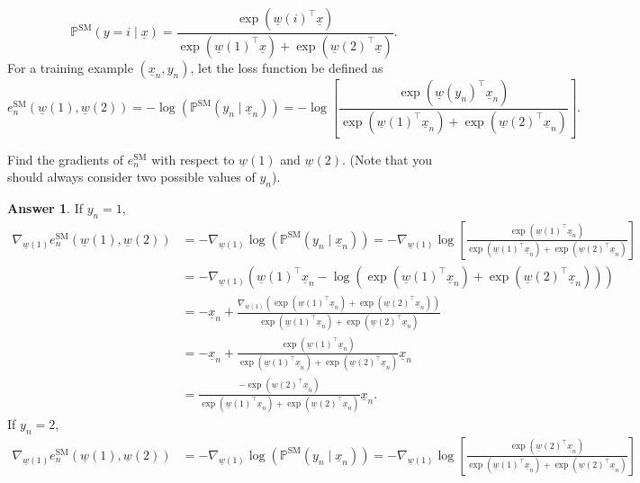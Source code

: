 \documentclass{article}
\newcommand{\probP}{\mathds{P}}
\theoremstyle{definition}
\newtheorem*{answer}{Answer}
\begin{document}
\begin{question}[start=0]
	\[
	\probP^{\text{SM}}(y = i\mid \underline{x}) = \frac{\exp(\underline{w}(i)^\top \underline{x})}{\exp(\underline{w}(1)^\top \underline{x}) + \exp(\underline{w}(2)^\top \underline{x})}.
	\]
	For a training example $(\underline{x}_n, y_n)$, let the loss function be defined as
	\[
	e^{\text{SM}}_{n}(\underline{w}(1), \underline{w}(2)) = -\log(\probP^{\text{SM}}(y_n\mid \underline{x}_n)) = -\log\left[\frac{\exp(\underline{w}(y_n)^\top \underline{x}_n)}{\exp(\underline{w}(1)^\top\underline{x}_n) + \exp(\underline{w}(2)^\top\underline{x}_n)}\right].
	\]
	\begin{question}
		\item Find the gradients of $e^{\text{SM}}_{n}$ with respect to $\underline{w}(1)$ and $\underline{w}(2)$. (Note that you should always consider two possible values of $y_n$).
		\begin{answer}
			If $y_n = 1$, 
			\begin{align*}
				\nabla_{\!\underline{w}(1)}e^{\text{SM}}_{n}(\underline{w}(1), \underline{w}(2)) &= - \nabla_{\!\underline{w}(1)}\log(\probP^{\text{SM}}(y_n\mid \underline{x}_n)) = - \nabla_{\!\underline{w}(1)} \log\left[\frac{\exp(\underline{w}(1)^\top \underline{x}_n)}{\exp(\underline{w}(1)^\top\underline{x}_n) + \exp(\underline{w}(2)^\top\underline{x}_n)}\right]\\
				&= - \nabla_{\!\underline{w}(1)} \left(\underline{w}(1)^\top \underline{x}_n - \log\left(\exp(\underline{w}(1)^\top\underline{x}_n) + \exp(\underline{w}(2)^\top\underline{x}_n)\right)\right)\\
				&= -\underline{x}_n + \frac{\nabla_{\!\underline{w}(1)}\left(\exp(\underline{w}(1)^\top\underline{x}_n) + \exp(\underline{w}(2)^\top\underline{x}_n)\right)}{\exp(\underline{w}(1)^\top\underline{x}_n) + \exp(\underline{w}(2)^\top\underline{x}_n)}\\
				&=  -\underline{x}_n + \frac{\exp(\underline{w}(1)^\top\underline{x}_n)}{\exp(\underline{w}(1)^\top\underline{x}_n) + \exp(\underline{w}(2)^\top\underline{x}_n)}\underline{x}_n\\
				&=  \frac{-\exp(\underline{w}(2)^\top\underline{x}_n)}{\exp(\underline{w}(1)^\top\underline{x}_n) + \exp(\underline{w}(2)^\top\underline{x}_n)}\underline{x}_n.
			\end{align*}
			If $y_n = 2$, 
			\begin{align*}
				\nabla_{\!\underline{w}(1)}e^{\text{SM}}_{n}(\underline{w}(1), \underline{w}(2)) &= - \nabla_{\!\underline{w}(1)}\log(\probP^{\text{SM}}(y_n\mid \underline{x}_n)) = - \nabla_{\!\underline{w}(1)} \log\left[\frac{\exp(\underline{w}(2)^\top \underline{x}_n)}{\exp(\underline{w}(1)^\top\underline{x}_n) + \exp(\underline{w}(2)^\top\underline{x}_n)}\right]\\

\end{align*}
\end{answer}
\end{question}
\end{question}
\end{document}
